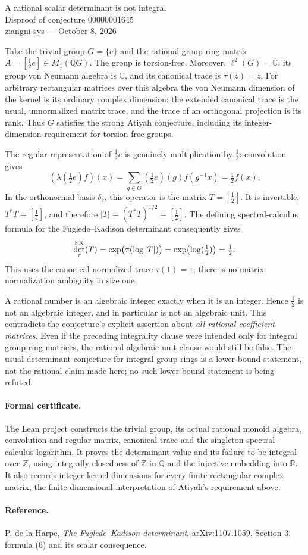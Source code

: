 \documentclass[11pt]{article}
\begin{document}
\begin{center}{\Large A rational scalar determinant is not integral}\\[4pt]
Disproof of conjecture 00000001645\\[4pt]
ziangni-sys --- October 8, 2026\end{center}

Take the trivial group $G=\{e\}$ and the rational group-ring matrix
$A=[\tfrac12 e]\in M_1(\mathbb QG)$. The group is torsion-free. Moreover,
$\ell^2(G)=\mathbb C$, its group von Neumann algebra is $\mathbb C$, and its
canonical trace is $\tau(z)=z$. For arbitrary rectangular matrices over this
algebra the von Neumann dimension of the kernel is its ordinary complex
dimension: the extended canonical trace is the usual, unnormalized matrix
trace, and the trace of an orthogonal projection is its rank. Thus $G$
satisfies the strong Atiyah conjecture, including its integer-dimension
requirement for torsion-free groups.

The regular representation of $\tfrac12 e$ is genuinely multiplication by
$\tfrac12$: convolution gives
\[
 (\lambda(\tfrac12 e)f)(x)
 =\sum_{g\in G}(\tfrac12 e)(g)f(g^{-1}x)=\tfrac12 f(x).
\]
In the orthonormal basis $\delta_e$, this operator is the matrix
$T=[\tfrac12]$. It is invertible, $T^*T=[\tfrac14]$, and therefore
$|T|=(T^*T)^{1/2}=[\tfrac12]$. The defining spectral-calculus formula for
the Fuglede--Kadison determinant consequently gives
\[
 \det^{\rm FK}_{\tau}(T)
 =\exp\bigl(\tau(\log |T|)\bigr)
 =\exp\bigl(\log(\tfrac12)\bigr)=\tfrac12.
\]
This uses the canonical normalized trace $\tau(1)=1$; there is no matrix
normalization ambiguity in size one.

A rational number is an algebraic integer exactly when it is an integer.
Hence $\tfrac12$ is not an algebraic integer, and in particular is not an
algebraic unit. This contradicts the conjecture's explicit assertion about
\emph{all rational-coefficient matrices}. Even if the preceding integrality
clause were intended only for integral group-ring matrices, the rational
algebraic-unit clause would still be false. The usual determinant conjecture
for integral group rings is a lower-bound statement, not the rational claim
made here; no such lower-bound statement is being refuted.

\paragraph{Formal certificate.}
The Lean project constructs the trivial group, its actual rational monoid
algebra, convolution and regular matrix, canonical trace and the singleton
spectral-calculus logarithm. It proves the determinant value and its failure
to be integral over $\mathbb Z$, using integrally closedness of $\mathbb Z$ in
$\mathbb Q$ and the injective embedding into $\mathbb R$. It also records
integer kernel dimensions for every finite rectangular complex matrix,
the finite-dimensional interpretation of Atiyah's requirement above.

\paragraph{Reference.}
P. de la Harpe, \emph{The Fuglede--Kadison determinant},
\href{https://arxiv.org/abs/1107.1059}{arXiv:1107.1059}, Section 3,
formula (6) and its scalar consequence.
\end{document}
